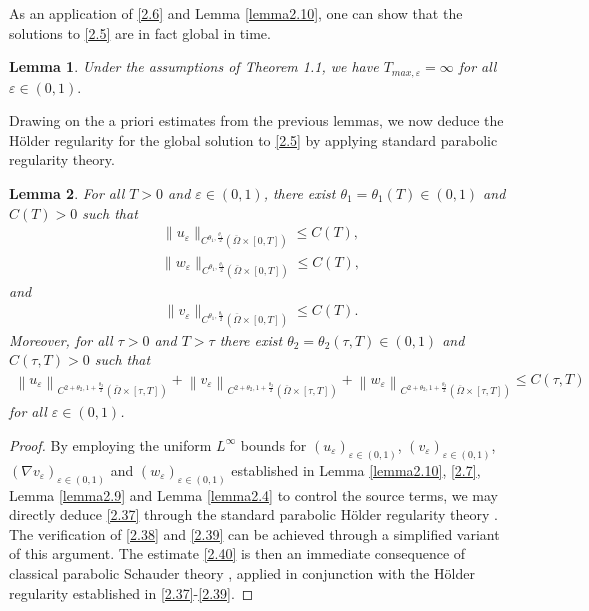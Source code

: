 \documentclass[12pt]{article}
\theoremstyle{plain}
\newtheorem{lemma}{Lemma}[section]
\theoremstyle{definition}
\numberwithin{equation}{section}
\begin{document}
As an application of \eqref{2.6} and Lemma \ref{lemma2.10}, one can show that the solutions to \eqref{2.5} are in fact global in time.
\begin{lemma}\label{lemma2.11}Under the assumptions of Theorem 1.1, we  have
$T_{max,\varepsilon}=\infty$ for all $\varepsilon\in(0,1).$
\end{lemma}
Drawing on the a priori estimates from the previous lemmas, we now deduce the
 H\"{o}lder regularity for the global solution to \eqref{2.5} by applying standard parabolic regularity theory.
\begin{lemma}\label{lemma2.12}
For all $T>0$ and
$\varepsilon\in(0,1)$, there exist $\theta_1=\theta_1(T)\in(0,1)$ and $C(T)>0$ such that
\begin{align}\label{2.37}
   \|u_{\varepsilon}\|_{C^{\theta_1,\frac{\theta_1}{2}}(\overline{\Omega}\times[0,T])} \leq C(T),
\end{align}
\begin{align}\label{2.38}
   \|w_{\varepsilon}\|_{C^{\theta_1,\frac{\theta_1}{2}}(\overline{\Omega}\times[0,T])} \leq C(T),
\end{align}
and
\begin{align}\label{2.39}
    \|v_{\varepsilon}\|_{C^{\theta_1,\frac{\theta_1}{2}}(\overline{\Omega}\times[0,T])} \leq C(T).
\end{align}
Moreover, for all $\tau>0$ and $T>\tau$ there exist $\theta_2=\theta_2(\tau,T)\in(0,1)$ and $C(\tau,T)>0$ such that
\begin{align}\label{2.40}
    \left\|u_{\varepsilon}\right\|_{C^{2+\theta_2,1+\frac{\theta_2}{2}}(\overline{\Omega}\times[\tau,T])}+
    \left\|v_{\varepsilon}\right\|_{C^{2+\theta_2,1+\frac{\theta_2}{2}}(\overline{\Omega}\times[\tau,T])}
    +\left\|w_{\varepsilon}\right\|_{C^{2+\theta_2,1+\frac{\theta_2}{2}}(\overline{\Omega}\times[\tau,T])}\leq C(\tau,T)
\end{align}
for all $\varepsilon\in(0,1)$.
\end{lemma}
\begin{proof}
By employing the uniform $L^{\infty}$ bounds for $(u_\varepsilon)_{\varepsilon\in(0,1)}$, $(v_\varepsilon)_{\varepsilon\in(0,1)}$,
$(\nabla v_\varepsilon)_{\varepsilon\in(0,1)}$ and $(w_\varepsilon)_{\varepsilon\in(0,1)}$ established in Lemma \ref{lemma2.10}, \eqref{2.7}, Lemma \ref{lemma2.9} and Lemma \ref{lemma2.4} to control the source terms, we may directly deduce \eqref{2.37} through the standard parabolic H\"{o}lder regularity theory \cite{Holder}. The verification of \eqref{2.38} and \eqref{2.39} can be achieved through a simplified variant of this argument. The estimate \eqref{2.40} is then an immediate consequence of classical parabolic Schauder theory \cite{Schauder}, applied in conjunction with the H\"{o}lder regularity established in \eqref{2.37}-\eqref{2.39}.
\end{proof}
\end{document}
